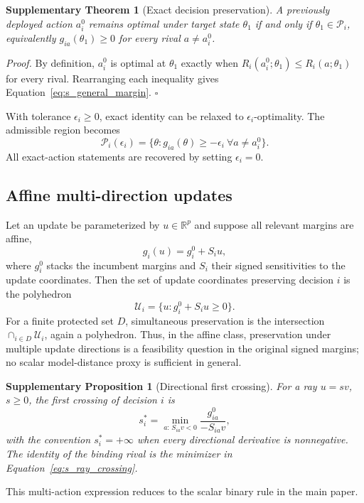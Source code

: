 \documentclass[11pt,letterpaper]{article}
\theoremstyle{plain}
\newtheorem{theorem}{Supplementary Theorem}
\newtheorem{proposition}{Supplementary Proposition}
\newcommand{\1}{\mathbf 1}
\begin{document}
\begin{theorem}[Exact decision preservation]
A previously deployed action $a_i^0$ remains optimal under target state $\theta_1$ if and only if $\theta_1\in\mathcal P_i$, equivalently $g_{ia}(\theta_1)\ge0$ for every rival $a\neq a_i^0$.
\end{theorem}
\textit{Proof.} By definition, $a_i^0$ is optimal at $\theta_1$ exactly when $R_i(a_i^0;\theta_1)\le R_i(a;\theta_1)$ for every rival. Rearranging each inequality gives Equation~\ref{eq:s_general_margin}. $\square$

With tolerance $\epsilon_i\ge0$, exact identity can be relaxed to $\epsilon_i$-optimality. The admissible region becomes
\begin{equation}
 \mathcal P_i(\epsilon_i)=\{\theta:g_{ia}(\theta)\ge-\epsilon_i\ \forall a\neq a_i^0\}.
\label{eq:s_tolerance_region}
\end{equation}
All exact-action statements are recovered by setting $\epsilon_i=0$.

\subsection{Affine multi-direction updates}
Let an update be parameterized by $u\in\mathbb R^p$ and suppose all relevant margins are affine,
\begin{equation}
 g_i(u)=g_i^0+S_i u,
\label{eq:s_multi_affine}
\end{equation}
where $g_i^0$ stacks the incumbent margins and $S_i$ their signed sensitivities to the update coordinates. Then the set of update coordinates preserving decision $i$ is the polyhedron
\begin{equation}
 \mathcal U_i=\{u:g_i^0+S_i u\ge0\}.
\label{eq:s_update_polyhedron}
\end{equation}
For a finite protected set $D$, simultaneous preservation is the intersection $\cap_{i\in D}\mathcal U_i$, again a polyhedron. Thus, in the affine class, preservation under multiple update directions is a feasibility question in the original signed margins; no scalar model-distance proxy is sufficient in general.

\begin{proposition}[Directional first crossing]
For a ray $u=s v$, $s\ge0$, the first crossing of decision $i$ is
\begin{equation}
 s_i^*=\min_{a:\,S_{ia}v<0}\frac{g_{ia}^0}{-S_{ia}v},
\label{eq:s_ray_crossing}
\end{equation}
with the convention $s_i^*=+\infty$ when every directional derivative is nonnegative. The identity of the binding rival is the minimizer in Equation~\ref{eq:s_ray_crossing}.
\end{proposition}
This multi-action expression reduces to the scalar binary rule in the main paper.
\end{document}
